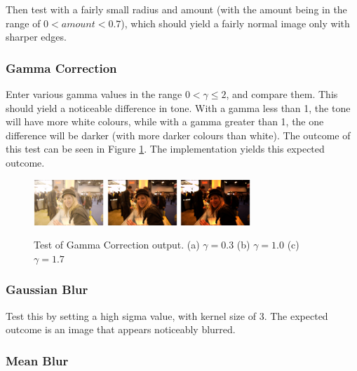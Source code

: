 \documentclass[10pt,a4paper]{article}
\begin{document}
Then test with a fairly small radius and amount (with the amount being in the range of $0 < amount < 0.7$), which should yield a fairly normal image only with sharper
edges.

\subsubsection{Gamma Correction}
Enter various gamma values in the range $0 < \gamma \leq 2$, and compare them. This should yield a noticeable difference in tone. With a gamma less than 1,
the tone will have more white colours, while with a gamma greater than 1, the one difference will be darker (with more darker colours than white). The
outcome of this test can be seen in Figure \ref{gammatest}. The implementation yields this expected outcome.

\begin{figure}\label{gammatest}
   \centering
   \subfigure
   {
       \includegraphics[width=100px]{gammacorrectionlow}
   }
   \subfigure
   {
       \includegraphics[width=100px]{gammacorrection_normal}
   }
   \subfigure
   {
       \includegraphics[width=100px]{gammacorrectionhigh}
   }
   \caption{
       Test of Gamma Correction output. 
       (a) $\gamma = 0.3$
       (b) $\gamma = 1.0$
       (c) $\gamma = 1.7$
   }
\end{figure}
\subsubsection{Gaussian Blur}
Test this by setting a high sigma value, with kernel size of 3. The expected outcome is an image that appears noticeably blurred.
\subsubsection{Mean Blur}
\end{document}
